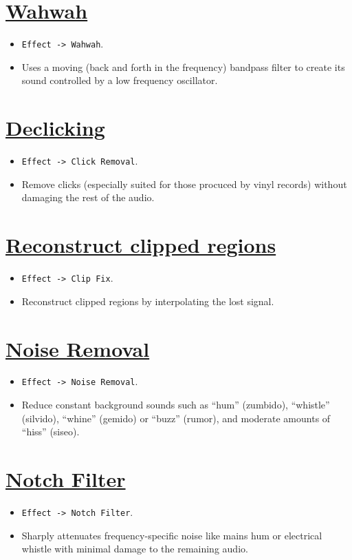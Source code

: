 \section{\href{http://manual.audacityteam.org/o/man/wahwah.htm}{Wahwah}}
\begin{itemize}
\item \verb|Effect -> Wahwah|.
\item Uses a moving (back and forth in the frequency) bandpass filter
  to create its sound controlled by a low frequency oscillator.
\end{itemize}

\section{\href{http://manual.audacityteam.org/o/man/click_removal.html}{Declicking}}
\begin{itemize}
\item \verb|Effect -> Click Removal|.
\item Remove clicks (especially suited for those procuced by vinyl records) without damaging the rest of the audio.
\end{itemize}

\section{\href{http://manual.audacityteam.org/o/man/clip_fix.html}{Reconstruct clipped regions}}
\begin{itemize}
\item \verb|Effect -> Clip Fix|.
\item Reconstruct clipped regions by interpolating the lost signal.
\end{itemize}

\section{\href{http://manual.audacityteam.org/o/man/noise_removal.html}{Noise Removal}}
\begin{itemize}
\item \verb|Effect -> Noise Removal|.
\item Reduce constant background sounds such as ``hum'' (zumbido),
  ``whistle'' (silvido), ``whine'' (gemido) or ``buzz'' (rumor), and
  moderate amounts of ``hiss'' (siseo).
\end{itemize}

\section{\href{http://manual.audacityteam.org/o/man/notch_filter.html}{Notch Filter}}
\begin{itemize}
\item \verb|Effect -> Notch Filter|.
\item Sharply attenuates frequency-specific noise like mains hum or
  electrical whistle with minimal damage to the remaining audio.
\end{itemize}

